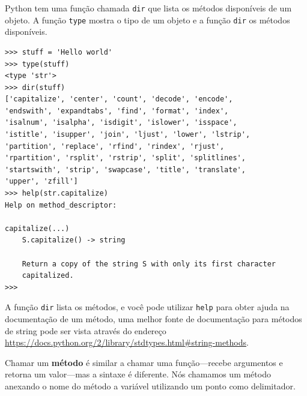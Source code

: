 {%

Python tem uma função chamada {\tt dir} que lista os métodos disponíveis de
um objeto. A função {\tt type} mostra o tipo de um objeto e a função {\tt dir}
os métodos disponíveis.

\beforeverb
\begin{verbatim}
>>> stuff = 'Hello world'
>>> type(stuff)
<type 'str'>
>>> dir(stuff)
['capitalize', 'center', 'count', 'decode', 'encode',
'endswith', 'expandtabs', 'find', 'format', 'index',
'isalnum', 'isalpha', 'isdigit', 'islower', 'isspace',
'istitle', 'isupper', 'join', 'ljust', 'lower', 'lstrip',
'partition', 'replace', 'rfind', 'rindex', 'rjust',
'rpartition', 'rsplit', 'rstrip', 'split', 'splitlines',
'startswith', 'strip', 'swapcase', 'title', 'translate',
'upper', 'zfill']
>>> help(str.capitalize)
Help on method_descriptor:

capitalize(...)
    S.capitalize() -> string

    Return a copy of the string S with only its first character
    capitalized.
>>>
\end{verbatim}
\afterverb
%


A função {\tt dir} lista os métodos, e você pode utilizar {\tt help}
para obter ajuda na documentação de um método, uma melhor fonte de
documentação para métodos de string pode ser vista através do endereço
\url{https://docs.python.org/2/library/stdtypes.html#string-methods}.


Chamar um {\bf método} é similar a chamar uma função---recebe argumentos e
retorna um valor---mas a sintaxe é diferente. Nós chamamos um método anexando
o nome do método a variável utilizando um ponto como delimitador.


}
